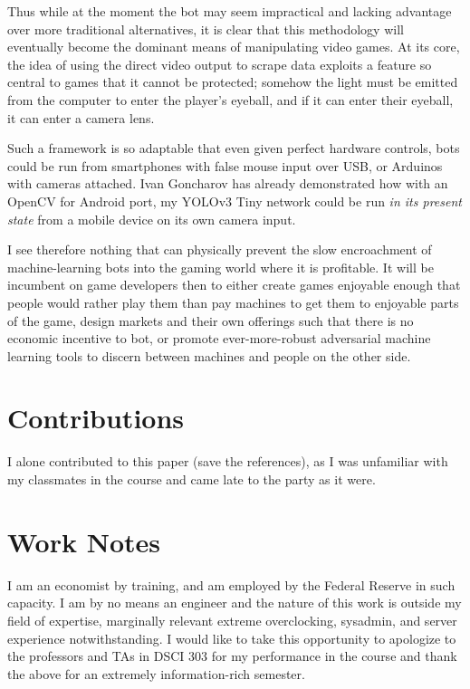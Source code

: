 \documentclass[sigconf]{acmart}
\begin{document}
Thus while at the moment the bot may seem impractical and lacking advantage over more traditional alternatives, it is clear that this methodology will eventually become the dominant means of manipulating video games. At its core, the idea of using the direct video output to scrape data exploits a feature so central to games that it cannot be protected; somehow the light must be emitted from the computer to enter the player's eyeball, and if it can enter their eyeball, it can enter a camera lens.

Such a framework is so adaptable that even given perfect hardware controls, bots could be run from smartphones with false mouse input over USB, or Arduinos with cameras attached. Ivan Goncharov has already demonstrated how with an OpenCV for Android port, my YOLOv3 Tiny network could be run \textit{in its present state} from a mobile device on its own camera input.\cite{Android}

I see therefore nothing that can physically prevent the slow encroachment of machine-learning bots into the gaming world where it is profitable. It will be incumbent on game developers then to either create games enjoyable enough that people would rather play them than pay machines to get them to enjoyable parts of the game, design markets and their own offerings such that there is no economic incentive to bot, or promote ever-more-robust adversarial machine learning tools to discern between machines and people on the other side.

\section{Contributions}

I alone contributed to this paper (save the references), as I was unfamiliar with my classmates in the course and came late to the party as it were.






\appendix

\section{Work Notes}

I am an economist by training, and am employed by the Federal Reserve in such capacity. I am by no means an engineer and the nature of this work is outside my field of expertise, marginally relevant extreme overclocking, sysadmin, and server experience notwithstanding. I would like to take this opportunity to apologize to the professors and TAs in DSCI 303 for my performance in the course and thank the above for an extremely information-rich semester.
\end{document}
